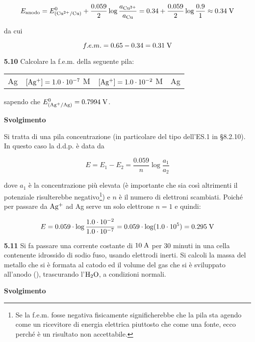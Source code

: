 $$E_{\rm anodo} = E^0_{(\rm Cu^{2+}/Cu)} + \frac{0.059}{2} \log \frac{a_{\rm Cu^{2+}}}{a_{\rm Cu}}
=0.34 + \frac{0.059}{2} \log \frac{0.9}{1}
\approx 0.34 \; \rm V$$

da cui

$$f.e.m.=0.65 - 0.34 = 0.31 \; \rm V$$

\newpage

\textbf{5.10} Calcolare la f.e.m. della seguente pila:

\begin{center}
    \begin{tabular}{p{0.6cm}|p{3.6cm}||p{3.6cm}|p{1cm}}
        Ag & $[\rm Ag^+]=1.0 \cdot 10^{-7}$ M & $[\rm Ag^+]=1.0 \cdot 10^{-2}$ M & Ag
    \end{tabular}
\end{center}

sapendo che $E^0_{(\rm Ag^{+}/Ag)}=0.7994 \; \rm V$.

\vspace{0.2cm}\large\textbf{Svolgimento}\normalsize

Si tratta di una pila concentrazione (in particolare del tipo dell'ES.1 in §8.2.10). In questo caso la d.d.p. è data da

$$E=E_1 - E_2 = \frac{0.059}{n} \log \frac{a_1}{a_2}$$

dove $a_1$ è la concentrazione più elevata (è importante che sia così altrimenti il potenziale risulterebbe negativo\footnote{Se la f.e.m. fosse negativa fisicamente significherebbe che la pila sta agendo come un ricevitore di energia elettrica piuttosto che come una fonte, ecco perché è un risultato non accettabile.}) e $n$ è il numero di elettroni scambiati. Poiché per passare da $\rm Ag^{+}$ ad Ag serve un solo elettrone $n=1$ e quindi:

\begin{equation*}
    E=0.059 \cdot \log \frac{1.0 \cdot 10^{-2}}{1.0 \cdot 10^{-7}}
    =0.059 \cdot \log (1.0 \cdot 10^{5})
    =0.295 \; \rm V
\end{equation*}

\textbf{5.11} Si fa passare una corrente costante di $10 \; \rm A$ per 30 minuti in una cella contenente idrossido di sodio fuso, usando elettrodi inerti. Si calcoli la massa del metallo che si è formata al catodo ed il volume del gas che si è sviluppato all'anodo (), trascurando l'$\rm H_2O$, a condizioni normali.

\vspace{0.2cm}\large\textbf{Svolgimento}\normalsize

